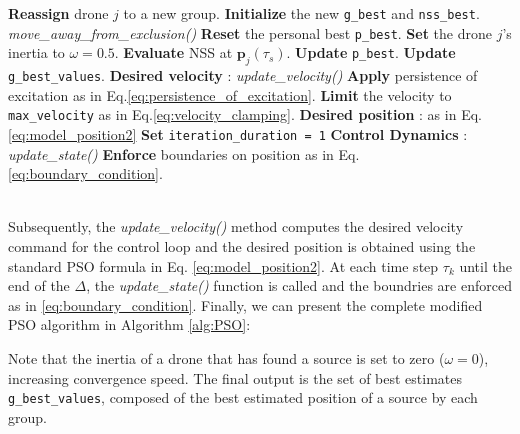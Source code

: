\begin{algorithm}
\begin{algorithmic}[1]
                        \State \textbf{Reassign} drone \( j \) to a new group.
                        \State \textbf{Initialize} the new \texttt{g\_best} and \texttt{nss\_best}.
                    \EndIf
                    \State \textit{move\_away\_from\_exclusion()}
                    \State \textbf{Reset} the personal best \texttt{p\_best}.
                    \State \textbf{Set} the drone \( j \)'s inertia to \( \omega = 0.5 \).
                \Else
                    \State \textbf{Evaluate} NSS at \(\mathbf{p}_j(\tau_s)\).
                        \State \textbf{Update} \texttt{p\_best}.
                    \EndIf
                        \State \textbf{Update} \texttt{g\_best\_values}.
                    \EndIf
                \EndIf
                \State \textbf{Desired velocity} : \textit{update\_velocity()}
                \State \textbf{Apply} persistence of excitation as in Eq.\eqref{eq:persistence_of_excitation}.
                \State \textbf{Limit} the velocity to \texttt{max\_velocity} as in Eq.\eqref{eq:velocity_clamping}.
                \State \textbf{Desired position} : as in Eq. \eqref{eq:model_position2}
                \State \textbf{Set} \texttt{iteration\_duration = 1}
                    \State \textbf{Control Dynamics} : \textit{update\_state()}   
                    \State \textbf{Enforce} boundaries on position as in Eq.\eqref{eq:boundary_condition}.
                \EndFor
            \EndFor
        \EndFor
    \end{algorithmic}
\end{algorithm}

\noindent\\
Subsequently, the \textit{update\_velocity()} method computes the desired 
velocity command for the control loop and the desired position is obtained 
using the standard PSO formula in Eq. \ref{eq:model_position2}.
At each time step $\tau_k$ until the end of the $\Delta$, 
the \textit{update\_state()} function is called and the
boundries are enforced as in \ref{eq:boundary_condition}.
Finally, we can present the complete modified PSO algorithm in 
Algorithm \ref{alg:PSO}: 

Note that the inertia of a drone that has found a source 
is set to zero (\(\omega = 0\)), increasing
convergence speed. The final output is the set of best estimates 
\texttt{g\_best\_values}, composed of the best estimated position 
of a source by each group.

